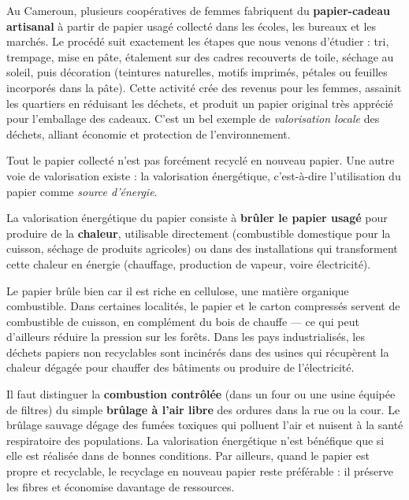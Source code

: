 \documentclass[11pt]{article}
\newcommand{\cle}[1]{{\popxbold\color{popdark}#1}}
\newcounter{popsec}
\newcounter{popsub}
\newcommand{\courssub}[1]{%
  \stepcounter{popsub}%
  \par\vspace{9pt}\noindent{\popxbold\fontsize{11.5}{13}\selectfont\color{popink}{\color{poporange}\thepopsec.\thepopsub}\hspace{6pt}#1}\par\nopagebreak\vspace{4pt}
}
\begin{document}
\begin{savaistu}
Au Cameroun, plusieurs coopératives de femmes fabriquent du \textbf{papier-cadeau artisanal} à partir de papier usagé collecté dans les écoles, les bureaux et les marchés. Le procédé suit exactement les étapes que nous venons d'étudier : tri, trempage, mise en pâte, étalement sur des cadres recouverts de toile, séchage au soleil, puis décoration (teintures naturelles, motifs imprimés, pétales ou feuilles incorporés dans la pâte). Cette activité crée des revenus pour les femmes, assainit les quartiers en réduisant les déchets, et produit un papier original très apprécié pour l'emballage des cadeaux. C'est un bel exemple de \emph{valorisation locale} des déchets, alliant économie et protection de l'environnement.
\end{savaistu}

\courssub{La valorisation énergétique du papier}

Tout le papier collecté n'est pas forcément recyclé en nouveau papier. Une autre voie de valorisation existe : la \cle{valorisation énergétique}, c'est-à-dire l'utilisation du papier comme \emph{source d'énergie}.

\begin{definition}
La \cle{valorisation énergétique} du papier consiste à \textbf{brûler le papier usagé} pour produire de la \textbf{chaleur}, utilisable directement (combustible domestique pour la cuisson, séchage de produits agricoles) ou dans des installations qui transforment cette chaleur en énergie (chauffage, production de vapeur, voire électricité).
\end{definition}

Le papier brûle bien car il est riche en cellulose, une matière organique combustible. Dans certaines localités, le papier et le carton compressés servent de combustible de cuisson, en complément du bois de chauffe — ce qui peut d'ailleurs réduire la pression sur les forêts. Dans les pays industrialisés, les déchets papiers non recyclables sont incinérés dans des usines qui récupèrent la chaleur dégagée pour chauffer des bâtiments ou produire de l'électricité.

\begin{attention}
Il faut distinguer la \textbf{combustion contrôlée} (dans un four ou une usine équipée de filtres) du simple \textbf{brûlage à l'air libre} des ordures dans la rue ou la cour. Le brûlage sauvage dégage des fumées toxiques qui polluent l'air et nuisent à la santé respiratoire des populations. La valorisation énergétique n'est bénéfique que si elle est réalisée dans de bonnes conditions. Par ailleurs, quand le papier est propre et recyclable, le recyclage en nouveau papier reste préférable : il préserve les fibres et économise davantage de ressources.
\end{attention}
\end{document}
